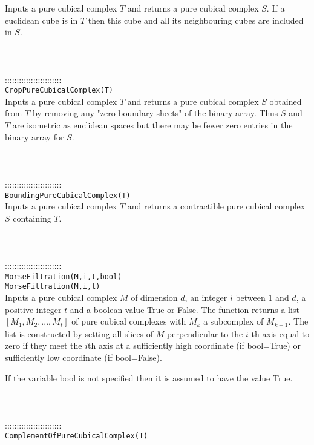 \documentclass[a4paper,11pt]{report}
\begin{document}
{ Inputs a pure cubical complex $T$ and returns a pure cubical complex $S$. If a euclidean cube is in $T$ then this cube and all its neighbouring cubes are included in $S$. \\
 \\
 \\
 \\
 ::::::::::::::::::::::::\\
 \texttt{CropPureCubicalComplex(T)}\\
 

 Inputs a pure cubical complex $T$ and returns a pure cubical complex $S$ obtained from $T$ by removing any "zero boundary sheets" of the binary array. Thus $S$ and $T$ are isometric as euclidean spaces but there may be fewer zero entries in the
binary array for $S$. \\
 \\
 \\
 \\
 ::::::::::::::::::::::::\\
 \texttt{BoundingPureCubicalComplex(T)}\\
 

 Inputs a pure cubical complex $T$ and returns a contractible pure cubical complex $S$ containing $T$. \\
 \\
 \\
 \\
 ::::::::::::::::::::::::\\
 \texttt{MorseFiltration(M,i,t,bool)}\\
 \texttt{MorseFiltration(M,i,t)}\\
 

 Inputs a pure cubical complex $M$ of dimension $d$, an integer $i$ between $1$ and $d$, a positive integer $t$ and a boolean value True or False. The function returns a list $[M_1, M_2, ..., M_t]$ of pure cubical complexes with $M_k$ a subcomplex of $M_{k+1}$. The list is constructed by setting all slices of $M$ perpendicular to the $i$-th axis equal to zero if they meet the $i$th axis at a sufficiently high coordinate (if bool=True) or sufficiently low
coordinate (if bool=False). 

 If the variable bool is not specified then it is assumed to have the value
True. \\
 \\
 \\
 \\
 ::::::::::::::::::::::::\\
 \texttt{ComplementOfPureCubicalComplex(T)}\\
 

}
\end{document}
